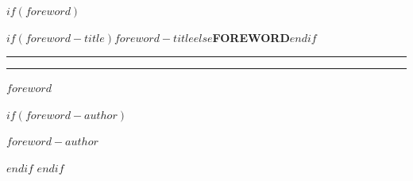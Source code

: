 $if(foreword)$
\cleardoublepage
\pagestyle{frontmatter}
\thispagestyle{plain}
\vspace*{120pt}
{\centering\chapterheadingfont\bfseries\Large{}\MakeTextUppercase{$if(foreword-title)$$foreword-title$$else$Foreword$endif$}\par}
\vspace{12pt}
{\centering\rule[0.5ex]{2cm}{0.4pt}\hspace{0.8em}\rule[0.5ex]{2cm}{0.4pt}\par}
\vspace{20pt}
\label{foreword}

\begingroup
\primaryfont\normalsize
\setlength{\parindent}{1.5em}
\noindent
$foreword$

$if(foreword-author)$
\vspace{24pt}
\begin{flushright}
{\scshape{}\MakeTextLowercase{$foreword-author$}}
\end{flushright}
$endif$
\endgroup
$endif$
